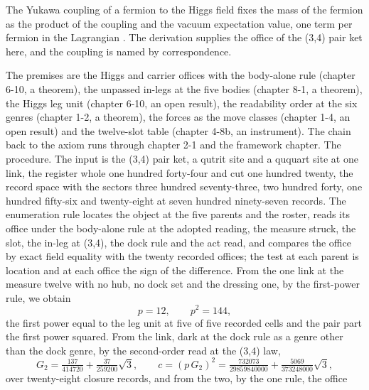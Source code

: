 \begin{chbridge}
The Yukawa coupling of a fermion to the Higgs field fixes the mass of the fermion as the product of the coupling and the vacuum expectation value, one term per fermion in the Lagrangian \cite{Yukawa1935,Weinberg1967}. The derivation supplies the office of the (3,4) pair ket here, and the coupling is named by correspondence.
\end{chbridge}
\begin{chproof}
The premises are the Higgs and carrier offices with the body-alone rule (chapter 6-10, a theorem), the unpassed in-legs at the five bodies (chapter 8-1, a theorem), the Higgs leg unit (chapter 6-10, an open result), the readability order at the six genres (chapter 1-2, a theorem), the forces as the move classes (chapter 1-4, an open result) and the twelve-slot table (chapter 4-8b, an instrument). The chain back to the axiom runs through chapter 2-1 and the framework chapter. The procedure. The input is the (3,4) pair ket, a qutrit site and a ququart site at one link, the register whole one hundred forty-four and cut one hundred twenty, the record space with the sectors three hundred seventy-three, two hundred forty, one hundred fifty-six and twenty-eight at seven hundred ninety-seven records. The enumeration rule locates the object at the five parents and the roster, reads its office under the body-alone rule at the adopted reading, the measure struck, the slot, the in-leg at (3,4), the dock rule and the act read, and compares the office by exact field equality with the twenty recorded offices; the test at each parent is location and at each office the sign of the difference. From the one link at the measure twelve with no hub, no dock set and the dressing one, by the first-power rule, we obtain
\begin{equation}
p = 12 , \qquad p^{2} = 144 ,
\end{equation}
the first power equal to the leg unit at five of five recorded cells and the pair part the first power squared. From the link, dark at the dock rule as a genre other than the dock genre, by the second-order read at the (3,4) law,
\begin{equation}
G_{2} = \tfrac{137}{414720} + \tfrac{37}{259200}\sqrt{3} , \qquad c = (p\, G_{2})^{2} = \tfrac{732073}{29859840000} + \tfrac{5069}{373248000}\sqrt{3} ,
\end{equation}
over twenty-eight closure records, and from the two, by the one rule, the office
\begin{equation}

\end{equation}
\end{chproof}
